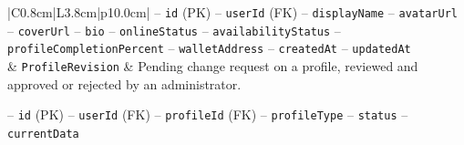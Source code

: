 \begin{center}
\begin{longtable}{|C{0.8cm}|L{3.8cm}|p{10.0cm}|}
\hspace*{1em}-- \texttt{id} (PK) \newline
\hspace*{1em}-- \texttt{user\allowbreak Id} (FK) \newline
\hspace*{1em}-- \texttt{display\allowbreak Name} \newline
\hspace*{1em}-- \texttt{avatar\allowbreak Url} \newline
\hspace*{1em}-- \texttt{cover\allowbreak Url} \newline
\hspace*{1em}-- \texttt{bio} \newline
\hspace*{1em}-- \texttt{online\allowbreak Status} \newline
\hspace*{1em}-- \texttt{availability\allowbreak Status} \newline
\hspace*{1em}-- \texttt{profile\allowbreak Completion\allowbreak Percent} \newline
\hspace*{1em}-- \texttt{wallet\allowbreak Address} \newline
\hspace*{1em}-- \texttt{created\allowbreak At} \newline
\hspace*{1em}-- \texttt{updated\allowbreak At} \\
 & \texttt{Profile\allowbreak Revision} & Pending change request on a profile, reviewed and approved or rejected by an administrator.\par\smallskip
\hspace*{1em}-- \texttt{id} (PK) \newline
\hspace*{1em}-- \texttt{user\allowbreak Id} (FK) \newline
\hspace*{1em}-- \texttt{profile\allowbreak Id} (FK) \newline
\hspace*{1em}-- \texttt{profile\allowbreak Type} \newline
\hspace*{1em}-- \texttt{status} \newline
\hspace*{1em}-- \texttt{current\allowbreak Data} \newline

\end{longtable}
\end{center}
